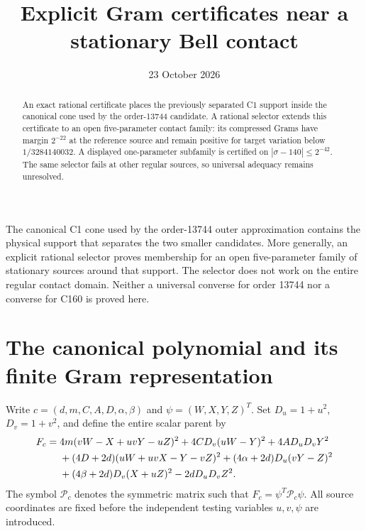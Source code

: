 \documentclass[11pt]{article}
\title{Explicit Gram certificates near a stationary Bell contact}
\author{}
\date{23 October 2026}
\begin{document}
\maketitle
\begin{abstract}
An exact rational certificate places the previously separated C1 support
inside the canonical cone used by the order-13744 candidate.  A rational
selector extends this certificate to an open five-parameter contact family:
its compressed Grams have margin $2^{-22}$ at the reference source and
remain positive for target variation below $1/3284140032$.
A displayed one-parameter subfamily is certified on
$|\sigma-140|\leq2^{-42}$.  The same selector fails at other regular
sources, so universal adequacy remains unresolved.
\end{abstract}

The canonical C1 cone used by the order-13744 outer approximation contains
the physical support that separates the two smaller candidates.  More
generally, an explicit rational selector proves membership for an open
five-parameter family of stationary sources around that support.  The
selector does not work on the entire regular contact domain.  Neither a
universal converse for order 13744 nor a converse for C160 is proved here.

\section{The canonical polynomial and its finite Gram representation}

Write $c=(d,m,C,A,D,\alpha,\beta)$ and $\psi=(W,X,Y,Z)^T$.
Set $D_u=1+u^2$, $D_v=1+v^2$, and define the entire scalar parent by
\begin{align}
 F_c={}&4m(vW-X+uvY-uZ)^2+4CD_v(uW-Y)^2
             +4AD_uD_vY^2 \notag\\
 &+(4D+2d)(uW+uvX-Y-vZ)^2
 +(4\alpha+2d)D_u(vY-Z)^2 \notag\\
 &+(4\beta+2d)D_v(X+uZ)^2-2dD_uD_vZ^2.
 \label{eq:parent}
\end{align}
The symbol $\mathcal P_c$ denotes the symmetric matrix such that
$F_c=\psi^T\mathcal P_c\psi$.  All source coordinates are fixed before
the independent testing variables $u,v,\psi$ are introduced.
\end{document}
